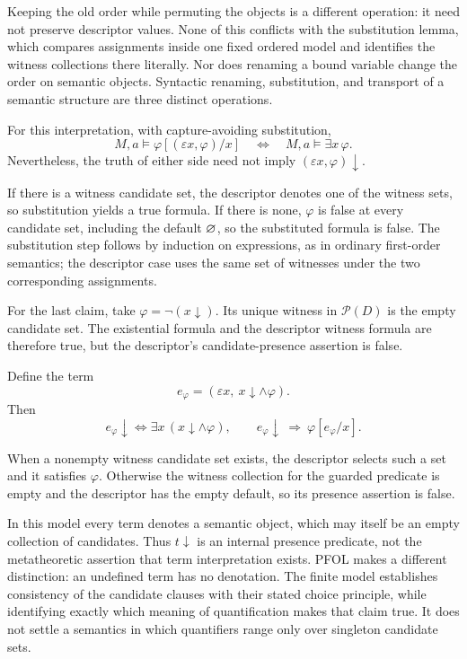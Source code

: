 Keeping the old order while permuting the objects is a different
operation: it need not preserve descriptor values. None of this
conflicts with the substitution lemma, which compares assignments
inside one fixed ordered model and identifies the witness collections
there literally. Nor does renaming a bound variable change the order
on semantic objects. Syntactic renaming, substitution, and transport
of a semantic structure are three distinct operations.

\begin{theorem}
For this interpretation, with capture-avoiding substitution,
\[
M,a\vDash\varphi[(\varepsilon x,\varphi)/x]
\quad\Longleftrightarrow\quad
M,a\vDash\exists x\,\varphi.
\]
Nevertheless, the truth of either side need not imply
$(\varepsilon x,\varphi)\downarrow$.
\end{theorem}
\Proof
If there is a witness candidate set, the descriptor denotes one of the
witness sets, so substitution yields a true formula. If there is none,
$\varphi$ is false at every candidate set, including the default
$\varnothing$, so the substituted formula is false. The substitution
step follows by induction on expressions, as in ordinary first-order
semantics; the descriptor case uses the same set of witnesses under the
two corresponding assignments.

For the last claim, take $\varphi=\neg(x\downarrow)$. Its unique
witness in $\mathcal P(D)$ is the empty candidate set. The existential
formula and the descriptor witness formula are therefore true, but the
descriptor's candidate-presence assertion is false.
\Done

\begin{corollary}
Define the term
\[
e_\varphi=(\varepsilon x,\ x\downarrow\land\varphi).
\]
Then
\[
e_\varphi\downarrow\iff\exists x\,(x\downarrow\land\varphi),
\qquad
 e_\varphi\downarrow\ \Longrightarrow\ \varphi[e_\varphi/x].
\]
\end{corollary}
\Proof
When a nonempty witness candidate set exists, the descriptor selects
such a set and it satisfies $\varphi$. Otherwise the witness collection
for the guarded predicate is empty and the descriptor has the empty
default, so its presence assertion is false.
\Done

In this model every term denotes a semantic object, which may itself be
an empty collection of candidates. Thus $t\downarrow$ is an internal
presence predicate, not the metatheoretic assertion that term
interpretation exists. PFOL makes a different distinction: an undefined
term has no denotation. The finite model establishes consistency of the
candidate clauses with their stated choice principle, while identifying
exactly which meaning of quantification makes that claim true. It does
not settle a semantics in which quantifiers range only over singleton
candidate sets.

